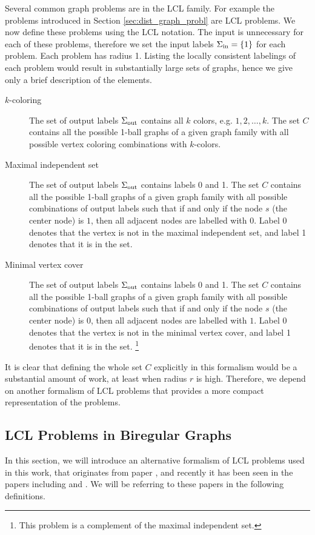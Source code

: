 Several common graph problems are in the LCL family.
For example the problems introduced in Section \ref{sec:dist_graph_probl} are LCL problems.
We now define these problems using the LCL notation.
The input is unnecessary for each of these problems,
therefore we set the input labels $\Sigma_{\text{in}} = \{1\}$ for each problem.
Each problem has radius 1.
Listing the locally consistent labelings of each problem would result in substantially large sets of graphs, hence we give only a brief description of the elements.
\begin{description}
  \item[$k$-coloring] The set of output labels $\Sigma_{\text{out}}$ contains all $k$ colors, e.g. $1, 2, \dotsc, k$.
  The set $C$ contains all the possible 1-ball graphs of a given graph family with all possible vertex coloring combinations with $k$-colors.
  \item[Maximal independent set]
  The set of output labels $\Sigma_{\text{out}}$ contains labels 0 and 1.
  The set $C$ contains all the possible 1-ball graphs of a given graph family with all possible combinations of output labels such that if and only if the node $s$ (the center node) is $1$, then all adjacent nodes are labelled with $0$.
  Label 0 denotes that the vertex is not in the maximal independent set, and label 1 denotes that it is in the set.
  \item[Minimal vertex cover]
  The set of output labels $\Sigma_{\text{out}}$ contains labels 0 and 1.
  The set $C$ contains all the possible 1-ball graphs of a given graph family with all possible combinations of output labels such that if and only if the node $s$ (the center node) is $0$, then all adjacent nodes are labelled with $1$.
  Label 0 denotes that the vertex is not in the minimal vertex cover, and label 1 denotes that it is in the set.
  \footnote{This problem is a complement of the maximal independent set.}
\end{description}

It is clear that defining the whole set $C$ explicitly in this formalism would be a substantial amount of work, at least when radius $r$ is high.
Therefore, we depend on another formalism of LCL problems that provides a more compact representation of the problems.

\subsection{LCL Problems in Biregular Graphs} \label{sec:lcl_problems:biregular}
In this section, we will introduce an alternative formalism of LCL problems used in this work, that originates from paper \cite{DBLP:conf/podc/Brandt19}, and recently it has been seen in the papers including \cite{DBLP:conf/podc/Olivetti20} and \cite{DBLP:journals/sigact/Suomela20}.
We will be referring to these papers in the following definitions.

